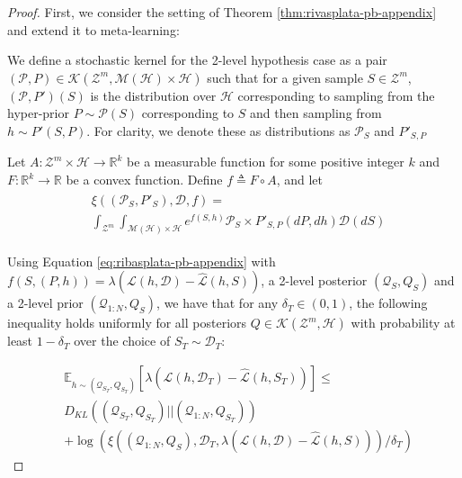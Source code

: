 \documentclass[letterpaper]{article} %
\theoremstyle{definition}
\newcommand{\Expect}[2]{\mathbb{E}_{#1}\left [#2 \right ]}
\begin{document}
\begin{proof}
	First, we consider the setting of Theorem \ref{thm:rivasplata-pb-appendix} and extend it to meta-learning:
	
	We define a stochastic kernel for the 2-level hypothesis case as a pair $(\mathcal{P},P)\in \mathcal{K}(\mathcal{Z}^m, \mathcal{M}(\mathcal{H})\times \mathcal{H})$ such that for a given sample $S\in \mathcal{Z}^m$,  $(\mathcal{P},P')(S)$ is the distribution over $\mathcal{H}$ corresponding to sampling from the hyper-prior $P\sim \mathcal{P}(S)$ corresponding to $S$ and then sampling from $h\sim P'(S, P)$. For clarity, we denote these as distributions as $\mathcal{P}_S$ and $P'_{S,P}$
	
	Let $A: \mathcal{Z}^m\times \mathcal{H}\rightarrow \mathbb{R}^k$ be a measurable function for some positive integer $k$ and $F:\mathbb{R}^k\rightarrow \mathbb{R}$ be a convex function.
	Define $f\triangleq F\circ A$, and let 
	\begin{align*} 
	\begin{split}
	&\xi((\mathcal{P}_S,P'_S), \mathcal{D}, f)=\\
	&\int_{\mathcal{Z}^m}\int_{\mathcal{M}(\mathcal{H})\times\mathcal{H}}e^{f(S, h)}\mathcal{P}_S\times P'_{S,P}(dP,dh)\mathcal{D}(dS)
	\end{split}
	\end{align*}
	
	Using Equation \ref{eq:ribasplata-pb-appendix} with $f(S,(P,h))=\lambda(\mathcal{L}(h,\mathcal{D})-\hat{\mathcal{L}}(h,S))$, a 2-level posterior $(\mathcal{Q}_S, Q_S)$ and a 2-level prior $(\mathcal{Q}_{1:N}, Q_S)$,
	we have that for any $\delta_T \in (0,1)$, the following inequality holds uniformly for all posteriors $Q\in \mathcal{K}(\mathcal{Z}^m, \mathcal{H})$ with probability at least $1-\delta_T$ over the choice of $S_T\sim \mathcal{D}_T$:
	
	\begin{equation} \label{eq:appendix-proof-eq}
	\begin{split}
	&\Expect{h\sim (\mathcal{Q}_{S_T}, Q_{S_T})}{\lambda(\mathcal{L}(h,\mathcal{D}_T)-\hat{\mathcal{L}}(h,S_T))} \leq \\ &D_{KL}((\mathcal{Q}_{S_T}, Q_{S_T})||(\mathcal{Q}_{1:N}, Q_{S_T}))\\
	&+\log\left (\xi\left ((\mathcal{Q}_{1:N}, Q_S), \mathcal{D}_T, \lambda(\mathcal{L}(h,\mathcal{D})-\hat{\mathcal{L}}(h,S))\right )/\delta_T\right )
	\end{split}
	\end{equation}
	

\end{proof}
\end{document}
